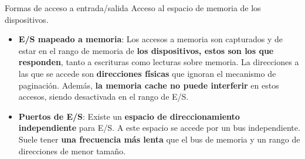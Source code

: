 \documentclass[aspectratio=169]{beamer}
\begin{document}
\begin{frame}{Formas de acceso a entrada/salida}
    Acceso al espacio de memoria de los dispositivos.
    { \small
    \begin{itemize}
    \item<1->[-] \textbf{E/S mapeado a memoria}: Los accesos a memoria son capturados y de estar en el rango de memoria de 
    \textcolor{verdeuca}{\textbf{los dispositivos, estos son los que responden}}, tanto a escrituras como lecturas sobre memoria.
    La direcciones a las que se accede son \textcolor{verdeuca}{\textbf{direcciones físicas}} que ignoran el mecanismo de paginación.
    Además, \textcolor{verdeuca}{\textbf{la memoria cache no puede interferir}} en estos accesos, siendo desactivada en el rango de E/S.
    \item<2->[-] \textbf{Puertos de E/S}: Existe un \textcolor{verdeuca}{\textbf{espacio de direccionamiento independiente}} para E/S. A este espacio se accede por un bus independiente. Suele tener \textcolor{verdeuca}{\textbf{una frecuencia más lenta}} que el bus de memoria y un rango de direcciones de menor tamaño.
    \end{itemize}
    }
\end{frame}
\end{document}
